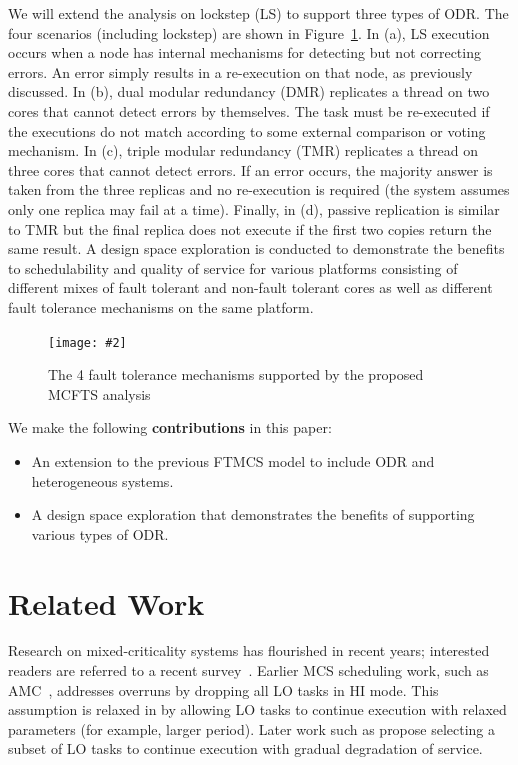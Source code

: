 \documentclass[conference]{IEEEtran}
\newcommand{\addfigure}[4]{
\begin{figure}[fh]
	\centering
	\texttt{[image: \#2]}
	\caption{#3}
	\label{#4}
\end{figure}
}
\begin{document}
	We will extend the analysis on lockstep (LS) to support three types of ODR. The four scenarios (including lockstep) are shown in Figure~\ref{f:ftm}. 
	In (a), LS execution occurs when a node has internal mechanisms for detecting but not correcting errors. 
	An error simply results in a re-execution on that node, as previously discussed. 	
	In (b), dual modular redundancy (DMR) replicates a thread on two cores that cannot detect errors by themselves. 
	The task must be re-executed if the executions do not match according to some external comparison or voting mechanism.
	In (c), triple modular redundancy (TMR) replicates a thread on three cores that cannot detect errors. 
	If an error occurs, the majority answer is taken from the three replicas and no re-execution is required (the system assumes only one replica may fail at a time).
	Finally, in (d), passive replication is similar to TMR but the final replica does not execute if the first two copies return the same result. 
	A design space exploration is conducted to demonstrate the benefits to schedulability and quality of service for various platforms consisting of different mixes of fault tolerant and non-fault tolerant cores as well as different fault tolerance mechanisms on the same platform.

\addfigure{0.55}{ftm.pdf}{The 4 fault tolerance mechanisms supported by the proposed MCFTS analysis}{f:ftm}
			
		
We make the following {\bf contributions} in this paper:
\begin{itemize}
  \item An extension to the previous FTMCS model to include ODR and heterogeneous systems.
  \item A design space exploration that demonstrates the benefits of supporting various types of ODR. 
\end{itemize}

\section{Related Work}

Research on mixed-criticality systems has flourished in recent years; interested readers are referred to a recent survey~\cite{burns2013mixed}.
Earlier MCS scheduling work, such as AMC~\cite{baruah2011response}, addresses overruns by dropping all LO tasks in HI mode. This assumption is relaxed in \cite{burns2013towards} by allowing LO tasks to continue execution with relaxed parameters (for example, larger period). Later work such as \cite{importance14} propose selecting a subset of LO tasks to continue execution with gradual degradation of service.
\end{document}
